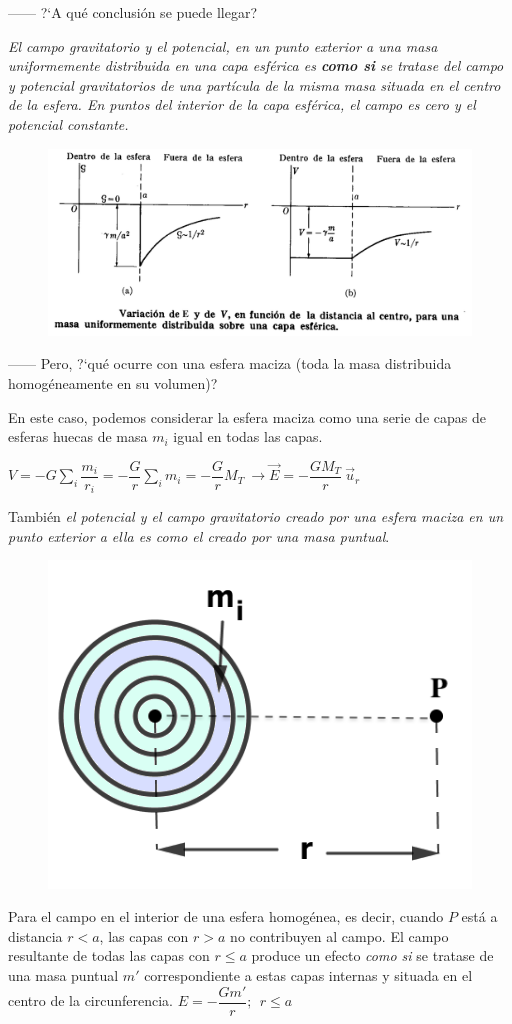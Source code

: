 ------ ?`A qué conclusión se puede llegar?

\emph{El campo gravitatorio y el potencial, en un punto exterior a una masa uniformemente distribuida en una capa esférica es \textbf{como si} se tratase del campo y potencial gravitatorios de una partícula de la misma masa situada en el centro de la esfera. En puntos del interior de la capa esférica, el campo es cero y el potencial constante.}

\begin{figure}[H]
	\centering
	\includegraphics[width=.75\textwidth]{imagenes/imagenes14/T14IM13.png}
\end{figure}

------ Pero, ?`qué ocurre con una esfera maciza (toda la masa distribuida homogéneamente en su volumen)?

En este caso, podemos considerar la esfera maciza como una serie de capas de esferas huecas de masa $m_i$ igual en todas las capas.

$\displaystyle V=-G \sum_i \dfrac {m_i}{r_i} =-\dfrac G r \sum_i m_i = -\dfrac G r M_T \ \to \vec E=-\dfrac {GM_T} r \ \vec u_r $

\begin{multicols}{2}
También \emph{el potencial y el campo gravitatorio creado por una esfera maciza en un punto exterior a ella es como el creado por una masa puntual}.
\begin{figure}[H]
	\centering
	\includegraphics[width=.3\textwidth]{imagenes/imagenes14/T14IM11.png}
\end{figure}	
\end{multicols}

Para el campo en el interior de una esfera homogénea, es decir, cuando $P$ está a distancia $r<a$, las capas con $r>a$ no contribuyen al campo. El campo resultante de todas las capas con $r\leq a$ produce un efecto \emph{como si} se tratase de una masa puntual $m'$ correspondiente a estas capas internas y situada en el centro de la circunferencia.
$E=-\dfrac{Gm'}{r};\ \ r\leq a$

